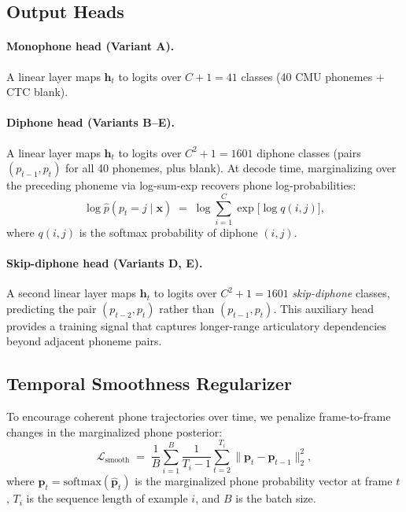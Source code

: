\documentclass[10pt,twocolumn]{article}
\begin{document}
\subsection{Output Heads}

\paragraph{Monophone head (Variant A).}
A linear layer maps $\mathbf{h}_t$ to logits over $C+1=41$ classes
(40 CMU phonemes + CTC blank).

\paragraph{Diphone head (Variants B--E).}
A linear layer maps $\mathbf{h}_t$ to logits over $C^2+1=1601$ diphone
classes (pairs $(p_{t-1}, p_t)$ for all 40 phonemes, plus blank).  At
decode time, marginalizing over the preceding phoneme via log-sum-exp
recovers phone log-probabilities:
\begin{equation}
  \log\hat{p}(p_t\!=\!j \mid \mathbf{x}) \;=\;
  \log\!\sum_{i=1}^{C}\exp\!\bigl[\log q(i,j)\bigr],
  \label{eq:marginalize}
\end{equation}
where $q(i,j)$ is the softmax probability of diphone $(i,j)$.

\paragraph{Skip-diphone head (Variants D, E).}
A second linear layer maps $\mathbf{h}_t$ to logits over $C^2+1=1601$
\emph{skip-diphone} classes, predicting the pair $(p_{t-2}, p_t)$
rather than $(p_{t-1}, p_t)$.  This auxiliary head provides a training
signal that captures longer-range articulatory dependencies beyond
adjacent phoneme pairs.

\subsection{Temporal Smoothness Regularizer}

To encourage coherent phone trajectories over time, we penalize
frame-to-frame changes in the marginalized phone posterior:
\begin{equation}
  \mathcal{L}_\text{smooth} \;=\;
  \frac{1}{B}\sum_{i=1}^{B}
  \frac{1}{T_i-1}\sum_{t=2}^{T_i}
  \bigl\|\mathbf{p}_t - \mathbf{p}_{t-1}\bigr\|_2^2,
  \label{eq:smooth}
\end{equation}
where $\mathbf{p}_t = \mathrm{softmax}(\hat{\mathbf{p}}_t)$ is the
marginalized phone probability vector at frame $t$, $T_i$ is the
sequence length of example $i$, and $B$ is the batch size.
\end{document}
